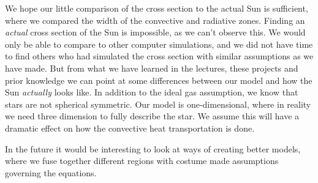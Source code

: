 \documentclass[11pt,a4paper,twocolumn,titlepage]{article}
\begin{document}
We hope our little comparison of the cross section to the actual Sun is sufficient, where we compared the width of the convective and radiative zones. Finding an \textit{actual} cross section of the Sun is impossible, as we can't observe this. We would only be able to compare to other computer simulations, and we did not have time to find others who had simulated the cross section with similar assumptions as we have made. But from what we have learned in the lectures, these projects and prior knowledge we can point at some differences between our model and how the Sun \textit{actually} looks like. In addition to the ideal gas assumption, we know that stars are not spherical symmetric. Our model is one-dimensional, where in reality we need three dimension to fully describe the star. We assume this will have a dramatic effect on how the convective heat transportation is done.

In the future it would be interesting to look at ways of creating better models, where we fuse together different regions with costume made assumptions governing the equations.


\end{document}
